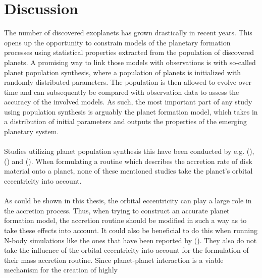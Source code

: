 
\chapter{Discussion}
  The number of discovered exoplanets has grown drastically in recent 
  years. This opens up the opportunity to constrain models of the planetary 
  formation processes using statistical properties extracted from the 
  population of discovered planets. A promising way to link those models with 
  observations is with so-called planet population synthesis, where a population 
  of planets is initialized with randomly distributed parameters. The population 
  is then allowed to evolve over time and can subsequently be compared with 
  observation data to assess the accuracy of the involved models. As such, 
  the most important part of any study using population synthesis is arguably 
  the planet formation model, which takes in a distribution of initial 
  parameters and outputs the properties of the emerging planetary system. \\
  \\
  Studies utilizing planet population synthesis this have been conducted by 
  e.g. \citeauthor{Ida_2018} (\citeyear{Ida_2018}), \citeauthor{Benz_2014} 
  (\citeyear{Benz_2014}) and \citeauthor{Mordasini_2012} 
  (\citeyear{Mordasini_2012}). When formulating a routine which describes the 
  accretion rate of disk material onto a planet, none of these mentioned 
  studies take the planet's orbital eccentricity into account. \\
  \\
  As could be shown in this thesis, the orbital eccentricity can play a 
  large role in the accretion process. Thus, when trying to construct an 
  accurate planet formation model, the accretion routine should be modified in 
  such a way as to take these effects into account. It could also be 
  beneficial to do this when running N-body simulations like the ones 
  that have been reported by \citeauthor{Bitsch_2019} (\citeyear{Bitsch_2019}).
  They also do not take the influence of the orbital eccentricity into 
  account for the formulation of their mass accretion routine. Since 
  planet-planet interaction is a viable mechanism for the creation of highly 
